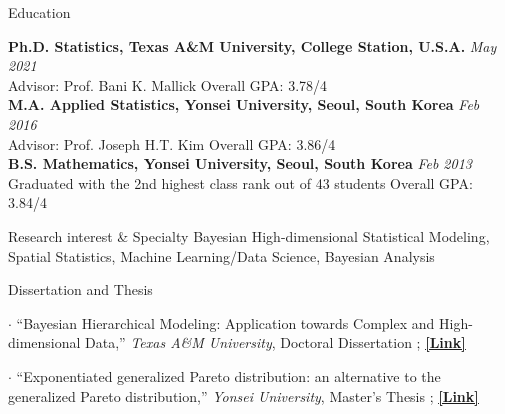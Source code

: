 \documentclass[
	11pt, %
]{resume} %
\begin{document}

\begin{rSection}{Education}
	
	\textbf{Ph.D. Statistics, Texas A\&M University, College Station, U.S.A.} \hfill \textit{May 2021} \\ 
Advisor: Prof. Bani K. Mallick
\hfill {Overall GPA: 3.78/4}
\\
	\textbf{M.A. Applied Statistics, Yonsei University, Seoul, South Korea} \hfill {\em Feb 2016} \\ 
Advisor: Prof. Joseph H.T. Kim
\hfill {Overall GPA: 3.86/4}
\\
{\bf B.S. Mathematics, Yonsei University, Seoul, South Korea} \hfill {\em Feb 2013} \\ 
Graduated with the 2nd highest class rank out of 43 students
\hfill {Overall GPA: 3.84/4}
\end{rSection}

\begin{rSection}{Research interest \& Specialty}
Bayesian High-dimensional Statistical Modeling, Spatial Statistics, Machine Learning/Data Science, Bayesian Analysis
\end{rSection}


\begin{rSection}{Dissertation and Thesis}
\item[$\cdot$] ``Bayesian Hierarchical Modeling: Application towards Complex and High-dimensional Data,''
\textit{Texas A\&M University}, Doctoral Dissertation
 ;
\href{https://oaktrust.library.tamu.edu/handle/1969.1/195691}{\underline{\textbf{[Link]}}}
\item[$\cdot$] ``Exponentiated generalized Pareto distribution: an alternative to the generalized Pareto distribution,''
\textit{Yonsei University}, Master's Thesis
;
\href{https://library.yonsei.ac.kr/search/detail/CAT000001777455?briefLink=/main/searchBrief?q=Seyoon+lee}{\underline{\textbf{[Link]}}}
\end{rSection}
\end{document}
